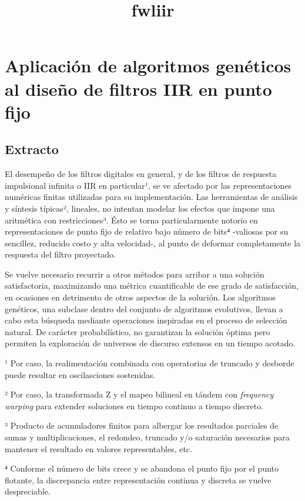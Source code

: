 \documentclass[11pt]{article}
\title{fwliir}
\begin{document}
    
    \section{Aplicación de algoritmos genéticos al diseño de filtros IIR en
punto
fijo}\label{aplicaciuxf3n-de-algoritmos-genuxe9ticos-al-diseuxf1o-de-filtros-iir-en-punto-fijo}

    \subsection{Extracto}\label{extracto}

    El desempeño de los filtros digitales en general, y de los filtros de
respuesta impulsional infinita o IIR en particular¹, se ve afectado por
las representaciones numéricas finitas utilizadas para su
implementación. Las herramientas de análisis y síntesis típicas²,
lineales, no intentan modelar los efectos que impone una aritmética con
restricciones³. Ésto se torna particularmente notorio en
representaciones de punto fijo de relativo bajo número de bits⁴
-valiosas por su sencillez, reducido costo y alta velocidad-, al punto
de deformar completamente la respuesta del filtro proyectado.

Se vuelve necesario recurrir a otros métodos para arribar a una solución
satisfactoria, maximizando una métrica cuantificable de ese grado de
satisfacción, en ocasiones en detrimento de otros aspectos de la
solución. Los algoritmos genéticos, una subclase dentro del conjunto de
algoritmos evolutivos, llevan a cabo esta búsqueda mediante operaciones
inspiradas en el proceso de selección natural. De carácter
probabilístico, no garantizan la solución óptima pero permiten la
exploración de universos de discurso extensos en un tiempo acotado.

¹ Por caso, la realimentación combinada con operatorias de truncado y
desborde puede resultar en oscilasciones sostenidas.

² Por caso, la transformada Z y el mapeo bilineal en tándem con
\emph{frequency warping} para extender soluciones en tiempo continuo a
tiempo discreto.

³ Producto de acumuladores finitos para albergar los resultados
parciales de sumas y multiplicaciones, el redondeo, truncado y/o
saturación necesarios para mantener el resultado en valores
representables, etc.

⁴ Conforme el número de bits crece y se abandona el punto fijo por el
punto flotante, la discrepancia entre representación continua y discreta
se vuelve despreciable.
\end{document}
